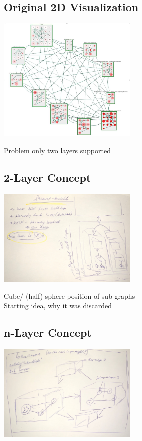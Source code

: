 \subsection{Original 2D Visualization}
\includegraphics[width=0.5\textwidth]{chapters/graphics/2dVisOfDemoData.jpg}

Problem only two layers supported

\subsection{2-Layer Concept}
\includegraphics[width=0.5\textwidth]{chapters/graphics/concept2.jpg}

Cube/ (half) sphere position of sub-graphs \\
Starting idea, why it was discarded

\subsection{n-Layer Concept}
\includegraphics[width=0.5\textwidth]{chapters/graphics/concept1.jpg}

